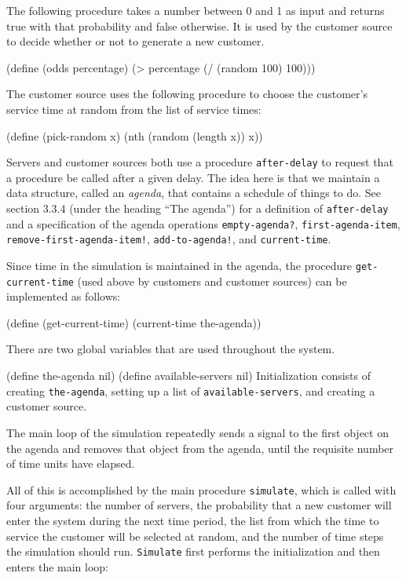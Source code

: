 The following procedure takes a number between
0 and 1 as input and returns true with that probability
and false otherwise.  It is used  by the customer source
to decide whether or not to generate a new customer.

\code
(define (odds percentage)
  (> percentage (/ (random 100) 100)))
\uncode

The customer source uses the following procedure to choose the
customer's service time at random from the list of service times:

\code
(define (pick-random x)
  (nth (random (length x)) x))
\uncode


Servers and customer sources both use a procedure {\tt after-delay}
to request that a procedure be called after a given delay.
The idea here is
that we maintain a data structure, called an {\it agenda}, that contains a
schedule of things to do.
See section 3.3.4 (under the heading ``The agenda'') for a definition
of {\tt after-delay} and a specification of the agenda operations
{\tt empty-agenda?}, {\tt first-agenda-item},
{\tt remove-first-agenda-item!}, {\tt add-to-agenda!}, and
{\tt current-time}.

Since time in the simulation is maintained in the agenda, the
procedure {\tt get-current-time} (used above by customers and customer sources)
can be implemented as follows:

\code
(define (get-current-time) (current-time the-agenda))
\uncode


There are two global variables that are used throughout the system.

\code
(define the-agenda nil)
(define available-servers nil)
\uncode\noindent
 Initialization consists of creating {\tt the-agenda}, setting up a
list of {\tt available-servers}, and creating a customer source.

The main loop of the simulation repeatedly sends a signal to the first
object on the agenda and removes that object from the agenda, until
the requisite number of time units have elapsed.

All of this is accomplished by the main procedure {\tt simulate}, which is
called with four arguments: the number of servers, the probability
that a new customer will enter the system during the next time
period, the list from which the time to service the customer will be
selected at random, and the number of time steps the simulation should
run.  {\tt Simulate} first performs the initialization and then enters
the main loop:


